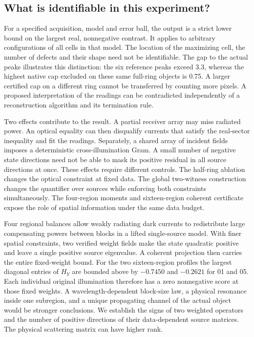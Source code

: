 \documentclass[anonymous,12pt]{iopjournal}
\theoremstyle{remark}\newtheorem{remark}[theorem]{Remark}
\numberwithin{equation}{section}
\begin{document}
\subsection{What is identifiable in this experiment?}
For a specified acquisition, model and error ball, the output is a strict lower bound on the largest real, nonnegative contrast. It applies to arbitrary configurations of all cells in that model. The location of the maximizing cell, the number of defects and their shape need not be identifiable. The gap to the actual peaks illustrates this distinction: the six reference peaks exceed 3.3, whereas the highest native cap excluded on these same full-ring objects is 0.75. A larger certified cap on a different ring cannot be transferred by counting more pixels. A proposed interpretation of the readings can be contradicted independently of a reconstruction algorithm and its termination rule.

Two effects contribute to the result. A partial receiver array may miss radiated power. An optical equality can then disqualify currents that satisfy the real-sector inequality and fit the readings. Separately, a shared array of incident fields imposes a deterministic cross-illumination Gram. A small number of negative state directions need not be able to mask its positive residual in all source directions at once. These effects require different controls. The half-ring ablation changes the optical constraint at fixed data. The global two-witness construction changes the quantifier over sources while enforcing both constraints simultaneously. The four-region moments and sixteen-region coherent certificate expose the role of spatial information under the same data budget.

Four regional balances allow weakly radiating dark currents to redistribute large compensating powers between blocks in a lifted single-source model. With finer spatial constraints, two verified weight fields make the state quadratic positive and leave a single positive source eigenvalue. A coherent projection then carries the entire fixed-weight bound. For the two sixteen-region profiles the largest diagonal entries of $H_Y$ are bounded above by $-0.7450$ and $-0.2621$ for 01 and 05. Each individual original illumination therefore has a zero nonnegative score at those fixed weights. A wavelength-dependent block-size law, a physical resonance inside one subregion, and a unique propagating channel of the actual object would be stronger conclusions. We establish the signs of two weighted operators and the number of positive directions of their data-dependent source matrices. The physical scattering matrix can have higher rank.
\end{document}
